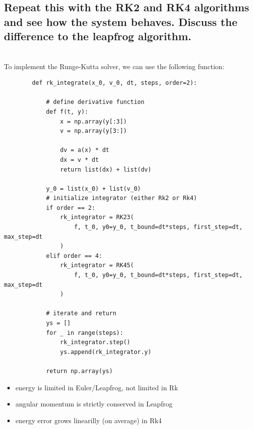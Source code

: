 \newpage
\subsection{Repeat this with the RK2 and RK4 algorithms and see how the 
    system behaves. Discuss the difference to the leapfrog algorithm.
} \ \\
    To implement the Runge-Kutta solver, we can use the following function: \\
    \begin{lstlisting}
        def rk_integrate(x_0, v_0, dt, steps, order=2):
        
            # define derivative function
            def f(t, y):
                x = np.array(y[:3])
                v = np.array(y[3:])
        
                dv = a(x) * dt
                dx = v * dt
                return list(dx) + list(dv)
        
            y_0 = list(x_0) + list(v_0)
            # initialize integrator (either Rk2 or Rk4)
            if order == 2:
                rk_integrator = RK23(
                    f, t_0, y0=y_0, t_bound=dt*steps, first_step=dt, max_step=dt
                )
            elif order == 4:
                rk_integrator = RK45(
                    f, t_0, y0=y_0, t_bound=dt*steps, first_step=dt, max_step=dt
                )
        
            # iterate and return
            ys = []
            for _ in range(steps):
                rk_integrator.step()
                ys.append(rk_integrator.y)
        
            return np.array(ys)\end{lstlisting}
    \begin{itemize}
        \item energy is limited in Euler/Leapfrog, not limited in Rk
        \item angular momentum is strictly conserved in Leapfrog
        \item energy error grows linearilly (on average) in Rk4
    \end{itemize}
    \newpage

